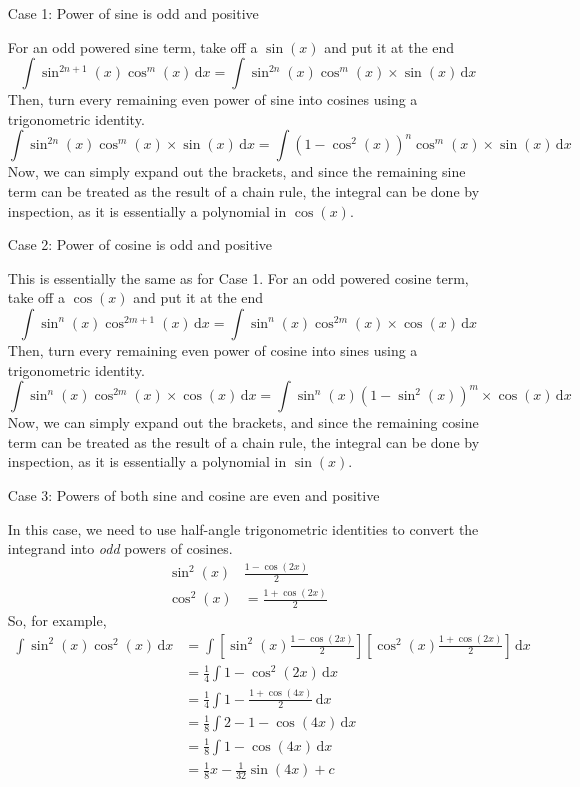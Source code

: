 \documentclass[11pt, a4paper]{article}
\begin{document}
\begin{itemize}
\item[Case 1:] Power of sine is odd and positive
\item[] For an odd powered sine term, take off a $\sin(x)$ and put it at the end
\begin{equation*}
\int \sin^{2n+1}(x)\cos^{m}(x)\,\mathrm{d}x=\int\sin^{2n}(x)\cos^{m}(x)\times\sin(x)\,\mathrm{d}x
\end{equation*}
Then, turn every remaining even power of sine into cosines using a trigonometric identity.
\begin{equation*}
\int \sin^{2n}(x)\cos^{m}(x)\times\sin(x)\,\mathrm{d}x=\int \left( 1-\cos^{2}(x) \right)^{n}\cos^{m}(x)\times\sin(x)\,\mathrm{d}x
\end{equation*}
Now, we can simply expand out the brackets, and since the remaining sine term can be treated as the result of a chain rule, the integral can be done by inspection, as it is essentially a polynomial in $\cos(x)$.
\newpage
\item[Case 2:] Power of cosine is odd and positive
\item[] This is essentially the same as for Case 1. For an odd powered cosine term, take off a $\cos(x)$ and put it at the end
\begin{equation*}
\int \sin^{n}(x)\cos^{2m+1}(x)\,\mathrm{d}x=\int\sin^{n}(x)\cos^{2m}(x)\times\cos(x)\,\mathrm{d}x
\end{equation*}
Then, turn every remaining even power of cosine into sines using a trigonometric identity.
\begin{equation*}
\int \sin^{n}(x)\cos^{2m}(x)\times\cos(x)\,\mathrm{d}x=\int \sin^{n}(x)\left( 1-\sin^{2}(x) \right)^{m}\times\cos(x)\,\mathrm{d}x
\end{equation*}
Now, we can simply expand out the brackets, and since the remaining cosine term can be treated as the result of a chain rule, the integral can be done by inspection, as it is essentially a polynomial in $\sin(x)$.
\item[Case 3:] Powers of both sine and cosine are even and positive
\item[] In this case, we need to use half-angle trigonometric identities to convert the integrand into \emph{odd} powers of cosines.
\begin{align*}
\sin^{2}(x)&\frac{1-\cos(2x)}{2} \\
\cos^{2}(x)&=\frac{1+\cos(2x)}{2}
\end{align*}
So, for example,
\begin{align*}
\int\sin^{2}(x)\cos^{2}(x)\,\mathrm{d}x&=\int\left[ \sin^{2}(x)\frac{1-\cos(2x)}{2} \right]\left[ \cos^{2}(x)\frac{1+\cos(2x)}{2} \right]\,\mathrm{d}x \\
&=\frac{1}{4}\int 1-\cos^{2}(2x)\,\mathrm{d}x \\
&=\frac{1}{4}\int 1-\frac{1+\cos(4x)}{2}\,\mathrm{d}x \\
&=\frac{1}{8}\int 2-1-\cos(4x)\,\mathrm{d}x \\
&=\frac{1}{8}\int 1-\cos(4x)\,\mathrm{d}x \\
&=\frac{1}{8}x-\frac{1}{32}\sin(4x)+c
\end{align*}
\end{itemize}
\end{document}
